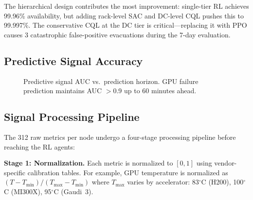 \documentclass[conference,10pt,letterpaper]{IEEEtran}
\begin{document}
The hierarchical design contributes the most improvement: single-tier RL achieves 99.96\% availability, but adding rack-level SAC and DC-level CQL pushes this to 99.997\%. The conservative CQL at the DC tier is critical---replacing it with PPO causes 3 catastrophic false-positive evacuations during the 7-day evaluation.

\subsection{Predictive Signal Accuracy}

\begin{figure}[!t]
\centering
{}
\caption{Predictive signal AUC vs.\ prediction horizon. GPU failure prediction maintains AUC $>$0.9 up to 60 minutes ahead.}
\label{fig:prediction}
\end{figure}


\subsection{Signal Processing Pipeline}

The 312 raw metrics per node undergo a four-stage processing pipeline before reaching the RL agents:

\textbf{Stage 1: Normalization.} Each metric is normalized to $[0,1]$ using vendor-specific calibration tables. For example, GPU temperature is normalized as $(T - T_{\min}) / (T_{\max} - T_{\min})$ where $T_{\max}$ varies by accelerator: 83$^\circ$C (H200), 100$^\circ$C (MI300X), 95$^\circ$C (Gaudi~3).
\end{document}
